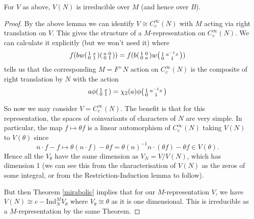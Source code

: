 \begin{prop}
    For $V$ as above, $V(N)$ is irreducible over $M$ (and hence over $B$).
\end{prop}
\begin{proof}
    By the above lemma we can identify $V \cong C_c^\infty(N)$ with $M$ acting via right translation on $V$. This gives the structure of a $M$-representation on $C_c^\infty(N)$. We can calculate it explicitly (but we won't need it) where
    $$f(bw\begin{psmallmatrix}
        1&x\\0&1
    \end{psmallmatrix}\begin{psmallmatrix}
        a&0\\0&1
    \end{psmallmatrix}) = f(b \begin{psmallmatrix}
        1&0\\0&a
    \end{psmallmatrix}w\begin{psmallmatrix}
        1&a^{-1}x\\0&1
    \end{psmallmatrix})$$
    tells us that the corresponding $M=F^\times N$ action on $C_c^\infty(N)$ is the composite of right translation by $N$ with the action 
    $$a\phi \begin{psmallmatrix}
        1&x\\0&1
    \end{psmallmatrix} = \chi_2(a) \phi \begin{psmallmatrix}
        1&a^{-1}x \\ 0&1
    \end{psmallmatrix}$$

    So now we may consider $V=C_c^\infty(N)$. The benefit is that for this representation, the spaces of coinvariants of characters of $N$ are very simple. In particular, the map $f \mapsto \theta f$ is a linear automorphism of $C_c^\infty(N)$ taking $V(N)$ to $V(\theta)$ since $$n \cdot f - f \mapsto \theta (n \cdot f) - \theta f = \theta(n)^{-1} n \cdot (\theta f) - \theta f \in V(\theta).$$
    Hence all the $V_\theta$ have the same dimension as $V_N=V/V(N)$, which has dimension 1 (we can see this from the characterisation of $V(N)$ as the zeros of some integral, or from the Restriction-Induction lemma to follow).

    But then Theorem \ref{mirabolic} implies that for our $M$-representation $V$, we have $V(N) \cong c-\mathrm{Ind}_N^M V_\theta$ where $V_\theta \cong \theta$ as it is one dimensional. This is irreducible as a $M$-representation by the same Theorem.
\end{proof}

